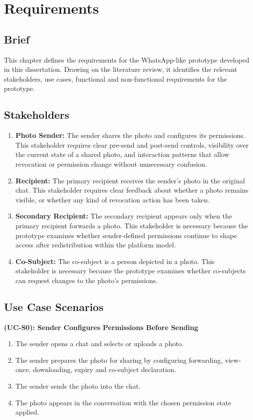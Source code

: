 \chapter{Requirements}
\section{Brief}
This chapter defines the requirements for the WhatsApp-like prototype developed in this dissertation. Drawing on the literature review, it identifies the relevant stakeholders, use cases, functional and non-functional requirements for the prototype.
\section{Stakeholders}

\begin{enumerate}
  \item \textbf{Photo Sender:}
  The sender shares the photo and configures its permissions. This stakeholder requires clear pre-send and post-send controls, visibility over the current state of a shared photo, and interaction patterns that allow revocation or permission change without unnecessary confusion.

  \item \textbf{Recipient:}
  The primary recipient receives the sender's photo in the original chat. This stakeholder requires clear feedback about whether a photo remains visible, or whether any kind of revocation action has been taken.

  \item \textbf{Secondary Recipient:}
  The secondary recipient appears only when the primary recipient forwards a photo. This stakeholder is necessary because the prototype examines whether sender-defined permissions continue to shape access after redistribution within the platform model.
 
  \item \textbf{Co-Subject:}
  The co-subject is a person depicted in a photo. This stakeholder is necessary because the prototype examines whether co-subjects can request changes to the photo's permissions.
\end{enumerate}

\section{Use Case Scenarios}

\textbf{(UC-S0): Sender Configures Permissions Before Sending}
\begin{enumerate}
    \item The sender opens a chat and selects or uploads a photo.
    \item The sender prepares the photo for sharing by configuring forwarding, view-once, downloading, expiry and co-subject declaration.
    \item The sender sends the photo into the chat.
    \item The photo appears in the conversation with the chosen permission state applied.
\end{enumerate}

